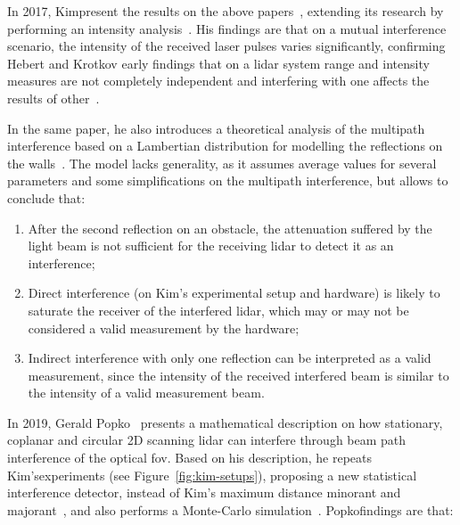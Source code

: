 

In 2017, Kim\etal present the results on the above papers~\cite{Kim2015a, Kim2015b, Kim2015c}, extending its research by performing an intensity analysis~\cite{Kim2017}. His findings are that on a mutual interference scenario, the intensity of the received laser pulses varies significantly, confirming Hebert and Krotkov early findings that on a \ac{lidar} system range and intensity measures are not completely independent and interfering with one affects the results of other~\cite{Hebert}.

In the same paper, he also introduces a theoretical analysis of the multipath interference based on a Lambertian distribution for modelling the reflections on the walls~\cite{Kim2017}. The model lacks generality, as it assumes average values for several parameters and some simplifications on the multipath interference, but allows to conclude that:

\begin{enumerate}
	\item After the second reflection on an obstacle, the attenuation suffered by the light beam is not sufficient for the receiving \ac{lidar} to detect it as an interference;
	\item Direct interference (on Kim's experimental setup and hardware) is likely to saturate the receiver of the interfered \ac{lidar}, which may or may not be considered a valid measurement by the hardware;
	\item Indirect interference with only one reflection can be interpreted as a valid measurement, since the intensity of the received interfered beam is similar to the intensity of a valid measurement beam.
\end{enumerate}

In 2019, Gerald Popko\etal~\cite{Popko2019a} presents a mathematical description on how stationary, coplanar and circular 2D scanning \ac{lidar} can interfere through beam path interference of the optical \ac{fov}. Based on his description, he repeats Kim's\etal experiments (see Figure~\ref{fig:kim-setups}), proposing a new statistical interference detector, instead of Kim's maximum distance minorant and majorant~\cite{Kim2015a}, and also performs a Monte-Carlo simulation~\cite{Popko2019b}. Popko\etal findings are that:

